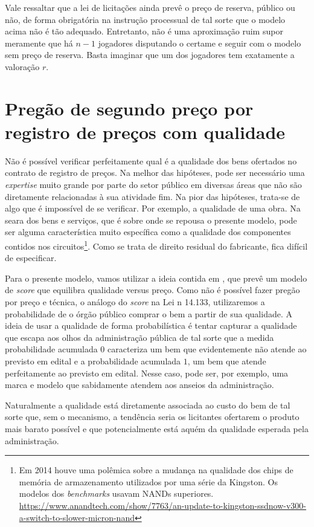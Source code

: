 Vale ressaltar que a lei de licitações ainda prevê o preço de reserva, público ou não, de forma obrigatória na instrução processual de tal sorte que o modelo acima não é tão adequado. Entretanto, não é uma aproximação ruim supor meramente que há $n-1$ jogadores disputando o certame e seguir com o modelo sem preço de reserva. Basta imaginar que um dos jogadores tem exatamente a valoração $r$.

\section{Pregão de segundo preço por registro de preços com qualidade}

Não é possível verificar perfeitamente qual é a qualidade dos bens ofertados no contrato de registro de preços. Na melhor das hipóteses, pode ser necessário uma \emph{expertise} muito grande por parte do setor público em diversas áreas que não são diretamente relacionadas à sua atividade fim. Na pior das hipóteses, trata-se de algo que é impossível de se verificar. Por exemplo, a qualidade de uma obra. Na seara dos bens e serviços, que é sobre onde se repousa o presente modelo, pode ser alguma característica muito específica como a qualidade dos componentes contidos nos circuitos\footnote{Em 2014 houve uma polêmica sobre a mudança na qualidade dos chips de memória de armazenamento utilizados por uma série da Kingston. Os modelos dos \emph{benchmarks} usavam NANDs superiores. \url{https://www.anandtech.com/show/7763/an-update-to-kingston-ssdnow-v300-a-switch-to-slower-micron-nand}}. Como se trata de direito residual do fabricante, fica difícil de especificar.

Para o presente modelo, vamos utilizar a ideia contida em \citet{Che1993}, que prevê um modelo de \emph{score} que equilibra qualidade versus preço. Como não é possível fazer pregão por preço e técnica, o análogo do \emph{score} na Lei n{\textordmasculine } 14.133, utilizaremos a probabilidade de o órgão público comprar o bem a partir de sua qualidade. A ideia de usar a qualidade de forma probabilística é tentar capturar a qualidade que escapa aos olhos da administração pública de tal sorte que a medida probabilidade acumulada $0$ caracteriza um bem que evidentemente não atende ao previsto em edital e a probabilidade acumulada $1$, um bem que atende perfeitamente ao previsto em edital. Nesse caso, pode ser, por exemplo, uma marca e modelo que sabidamente atendem aos anseios da administração.

Naturalmente a qualidade está diretamente associada ao custo do bem de tal sorte que, sem o mecanismo, a tendência seria os licitantes ofertarem o produto mais barato possível e que potencialmente está aquém da qualidade esperada pela administração.

